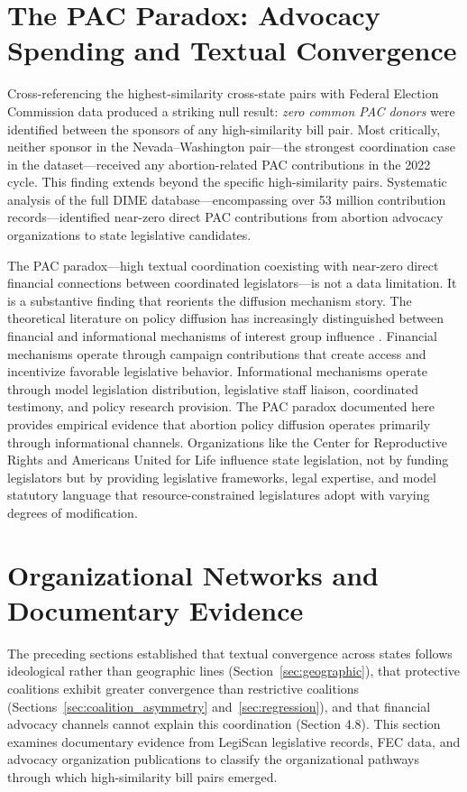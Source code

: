 \section{The PAC Paradox: Advocacy Spending and Textual Convergence}
\label{sec:pac_paradox}
Cross-referencing the highest-similarity cross-state pairs with Federal Election Commission data produced a striking null result: \textit{zero common PAC donors} were identified between the sponsors of any high-similarity bill pair. Most critically, neither sponsor in the Nevada--Washington pair---the strongest coordination case in the dataset---received any abortion-related PAC contributions in the 2022 cycle. This finding extends beyond the specific high-similarity pairs. Systematic analysis of the full DIME database---encompassing over 53 million contribution records---identified near-zero direct PAC contributions from abortion advocacy organizations to state legislative candidates.

The PAC paradox---high textual coordination coexisting with near-zero direct financial connections between coordinated legislators---is not a data limitation. It is a substantive finding that reorients the diffusion mechanism story. The theoretical literature on policy diffusion has increasingly distinguished between financial and informational mechanisms of interest group influence \parencite{hallLobbyingLegislativeSubsidy2006a,hertel-fernandezStateCapture2019}. Financial mechanisms operate through campaign contributions that create access and incentivize favorable legislative behavior. Informational mechanisms operate through model legislation distribution, legislative staff liaison, coordinated testimony, and policy research provision. The PAC paradox documented here provides empirical evidence that abortion policy diffusion operates primarily through informational channels. Organizations like the Center for Reproductive Rights and Americans United for Life influence state legislation, not by funding legislators but by providing legislative frameworks, legal expertise, and model statutory language that resource-constrained legislatures adopt with varying degrees of modification.

\section{Organizational Networks and Documentary Evidence}
\label{sec:org_networks}

The preceding sections established that textual convergence across states follows ideological rather than geographic lines (Section~\ref{sec:geographic}), that protective coalitions exhibit greater convergence than restrictive coalitions 
(Sections~\ref{sec:coalition_asymmetry} and~\ref{sec:regression}), and that financial advocacy channels cannot explain this coordination (Section 4.8).
This section examines documentary evidence from LegiScan legislative records, FEC data, and advocacy organization publications to classify the organizational pathways through which high-similarity bill pairs emerged.


